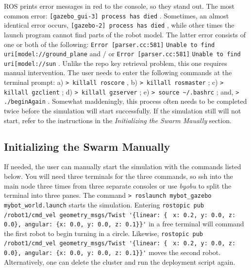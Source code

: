 \documentclass[9pt,twocolumn,twoside]{../../styles/osajnl}
\begin{document}
ROS prints error messages in red to the console, so they stand out.  The most common error: {\color{red} \lstinline[style=BashInputStyle]![gazebo_gui-3] process has died! }.  Sometimes, an almost identical error occurs, {\color{red} \lstinline[style=BashInputStyle]![gazebo-2] process has died! }, while other times the launch program cannot find parts of the robot model.  The latter error consists of one or both of the following: {\color{red} \lstinline[style=BashInputStyle]!Error [parser.cc:581]! }{\lstinline[style=BashInputStyle]!Unable to find uri[model://ground_plane! } and / or {\color{red} \lstinline[style=BashInputStyle]!Error [parser.cc:581]! }{\lstinline[style=BashInputStyle]!Unable to find uri[model://sun! }.  Unlike the repo key retrieval problem, this one requires manual intervention.  The user needs to enter the following commands at the terminal prompt: a) {\color{green} \lstinline[style=BashInputStyle]!> killall roscore! }, b) {\color{green} \lstinline[style=BashInputStyle]!> killall rosmaster! }; c) {\color{green} \lstinline[style=BashInputStyle]!> killall gzclient! }; d) {\color{green} \lstinline[style=BashInputStyle]!> killall gzserver! }; e) {\color{green} \lstinline[style=BashInputStyle]!> source ~/.bashrc! }; and, {\color{green} \lstinline[style=BashInputStyle]!> ./beginAgain! }. Somewhat maddeningly, this process often needs to be completed twice before the simulation will start successfully.  If the simulation still will not start, refer to the instructions in the \textit{Initializing the Swarm Maually} section.

\subsection{Initializing the Swarm Manually}
If needed, the user can manually start the simulation with the commands listed below.  You will need three terminals for the three commands, so ssh into the main node three times from three separate consoles or use \textit{byobu} to split the terminal into three panes.  The command {\color{green} \lstinline[style=BashInputStyle]!> roslaunch mybot_gazebo mybot_world.launch! } starts the simulation.  Entering {\color{green} \lstinline[style=BashInputStyle]!rostopic pub /robot1/cmd_vel geometry_msgs/Twist '{linear: { !} {\color{green} \lstinline[style=BashInputStyle]!x: 0.2, y: 0.0, z: 0.0}, angular: {x: 0.0, y: 0.0, z: 0.1}}'! } \newline in a free terminal will command the first robot to begin turning in a circle.  Likewise, {\color{green} \lstinline[style=BashInputStyle]!rostopic pub /robot1/cmd_vel geometry_msgs/Twist '{linear: { !} {\color{green} \lstinline[style=BashInputStyle]!x: 0.2, y: 0.0, z: 0.0}, angular: {x: 0.0, y: 0.0, z: 0.1}}'! } \newline moves the second robot. Alternatively, one can delete the cluster and run the deployment script again.
\end{document}
